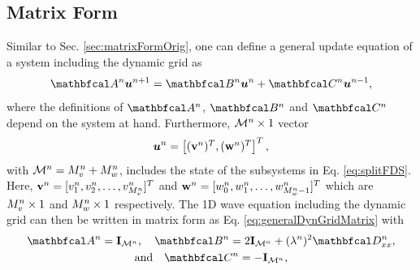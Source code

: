 \documentclass[fleqn]{jaes}
\def\SBcomment[#1]{\textcolor{red}{#1}}
\def\SWcomment[#1]{\textcolor{blue}{#1}}
\begin{document}
\subsection{Matrix Form}\label{sec:matrixForm}
Similar to Sec. \ref{sec:matrixFormOrig}, one can define a general update equation of a system including the dynamic grid as
\begin{equation}\label{eq:generalDynGridMatrix}
    \AA \uStack^{n+1} = \BB \uStack^n + \CC \uStack^{n-1},
\end{equation}
where the definitions of $\AA$, $\BB$ and $\CC$ depend on the system at hand. %
Furthermore, ${\mathcal{M}^n} \times 1$ vector
\begin{equation}\label{eq:uStack}
    \uStack^n = \begin{bmatrix}
    (\v^n)^T, (\w^n)^T
    \end{bmatrix}^T,
\end{equation}
with ${\mathcal{M}^n} = M_v^n + M_w^n$, includes the state of the subsystems in Eq. \eqref{eq:splitFDS}. Here, $\mathbf{v}^n = [v_1^n, v_2^n, \hdots, v_{M_v^n}^n]^T$ and $\mathbf{w}^n = [w_0^n, w_1^n, \hdots, w_{M_w^n-1}^n]^T$ which are $M_v^n \times 1$ and $M_w^n \times 1$ respectively. 
The 1D wave equation including the dynamic grid can then be written in matrix form as Eq. \eqref{eq:generalDynGridMatrix} with
\begin{equation}\label{eq:1DwaveDynMatrix}
\begin{gathered}
    \AA = \I_{\MoneD}, \quad \BB = 2\I_\MoneD + (\lambda^n)^2\DDxx,\\
\text{and} \quad\CC = -\I_{\MoneD},
\end{gathered}
\end{equation}
\end{document}
